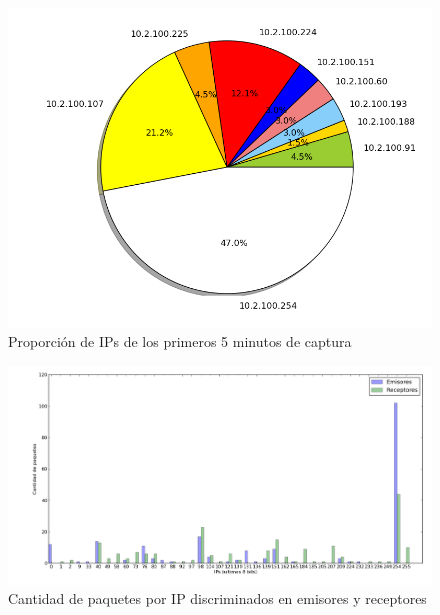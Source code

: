 \begin{figure}[!h]
  \includegraphics[width=\textwidth,keepaspectratio]{graph/torta-facu.png}
  \caption{Proporción de IPs de los primeros 5 minutos de captura}
  \label{fig:torta-facu}
\end{figure}

\begin{figure}[!h]
  \includegraphics[width=\textwidth,keepaspectratio]{graph/barras-facu.png}
  \caption{Cantidad de paquetes por IP discriminados en emisores y receptores}
  \label{fig:barras-facu}
\end{figure}

